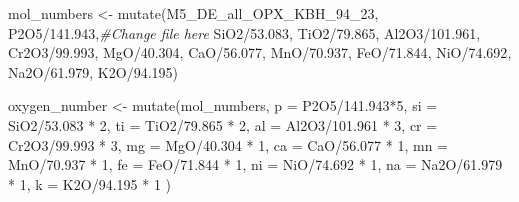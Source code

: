 \documentclass[
]{article}
\newenvironment{Shaded}{\begin{snugshade}}{\end{snugshade}}
\newcommand{\AttributeTok}[1]{\textcolor[rgb]{0.77,0.63,0.00}{#1}}
\newcommand{\CommentTok}[1]{\textcolor[rgb]{0.56,0.35,0.01}{\textit{#1}}}
\newcommand{\DecValTok}[1]{\textcolor[rgb]{0.00,0.00,0.81}{#1}}
\newcommand{\FloatTok}[1]{\textcolor[rgb]{0.00,0.00,0.81}{#1}}
\newcommand{\FunctionTok}[1]{\textcolor[rgb]{0.00,0.00,0.00}{#1}}
\newcommand{\NormalTok}[1]{#1}
\newcommand{\OtherTok}[1]{\textcolor[rgb]{0.56,0.35,0.01}{#1}}
\newcommand{\SpecialCharTok}[1]{\textcolor[rgb]{0.00,0.00,0.00}{#1}}
\begin{document}
\begin{Shaded}
\begin{Highlighting}[]
\NormalTok{mol\_numbers }\OtherTok{\textless{}{-}} \FunctionTok{mutate}\NormalTok{(M5\_DE\_all\_OPX\_KBH\_94\_23, P2O5}\SpecialCharTok{/}\FloatTok{141.943}\NormalTok{,}\CommentTok{\#Change file here}
\NormalTok{                  SiO2}\SpecialCharTok{/}\FloatTok{53.083}\NormalTok{,}
\NormalTok{                  TiO2}\SpecialCharTok{/}\FloatTok{79.865}\NormalTok{,}
\NormalTok{                  Al2O3}\SpecialCharTok{/}\FloatTok{101.961}\NormalTok{,}
\NormalTok{                  Cr2O3}\SpecialCharTok{/}\FloatTok{99.993}\NormalTok{,}
\NormalTok{                  MgO}\SpecialCharTok{/}\FloatTok{40.304}\NormalTok{,}
\NormalTok{                  CaO}\SpecialCharTok{/}\FloatTok{56.077}\NormalTok{,}
\NormalTok{                  MnO}\SpecialCharTok{/}\FloatTok{70.937}\NormalTok{,}
\NormalTok{                  FeO}\SpecialCharTok{/}\FloatTok{71.844}\NormalTok{,}
\NormalTok{                  NiO}\SpecialCharTok{/}\FloatTok{74.692}\NormalTok{,}
\NormalTok{                  Na2O}\SpecialCharTok{/}\FloatTok{61.979}\NormalTok{,}
\NormalTok{                  K2O}\SpecialCharTok{/}\FloatTok{94.195}\NormalTok{)}

\NormalTok{oxygen\_number }\OtherTok{\textless{}{-}} \FunctionTok{mutate}\NormalTok{(mol\_numbers, }\AttributeTok{p =}\NormalTok{ P2O5}\SpecialCharTok{/}\FloatTok{141.943}\SpecialCharTok{*}\DecValTok{5}\NormalTok{,}
                        \AttributeTok{si =}\NormalTok{ SiO2}\SpecialCharTok{/}\FloatTok{53.083} \SpecialCharTok{*} \DecValTok{2}\NormalTok{,}
                        \AttributeTok{ti =}\NormalTok{ TiO2}\SpecialCharTok{/}\FloatTok{79.865} \SpecialCharTok{*} \DecValTok{2}\NormalTok{,}
                        \AttributeTok{al =}\NormalTok{ Al2O3}\SpecialCharTok{/}\FloatTok{101.961} \SpecialCharTok{*} \DecValTok{3}\NormalTok{,}
                        \AttributeTok{cr =}\NormalTok{ Cr2O3}\SpecialCharTok{/}\FloatTok{99.993} \SpecialCharTok{*} \DecValTok{3}\NormalTok{,}
                        \AttributeTok{mg =}\NormalTok{ MgO}\SpecialCharTok{/}\FloatTok{40.304} \SpecialCharTok{*} \DecValTok{1}\NormalTok{,}
                        \AttributeTok{ca =}\NormalTok{ CaO}\SpecialCharTok{/}\FloatTok{56.077} \SpecialCharTok{*} \DecValTok{1}\NormalTok{,}
                        \AttributeTok{mn =}\NormalTok{ MnO}\SpecialCharTok{/}\FloatTok{70.937} \SpecialCharTok{*} \DecValTok{1}\NormalTok{,}
                        \AttributeTok{fe =}\NormalTok{ FeO}\SpecialCharTok{/}\FloatTok{71.844} \SpecialCharTok{*} \DecValTok{1}\NormalTok{,}
                        \AttributeTok{ni =}\NormalTok{ NiO}\SpecialCharTok{/}\FloatTok{74.692} \SpecialCharTok{*} \DecValTok{1}\NormalTok{,}
                        \AttributeTok{na =}\NormalTok{ Na2O}\SpecialCharTok{/}\FloatTok{61.979} \SpecialCharTok{*} \DecValTok{1}\NormalTok{,}
                        \AttributeTok{k =}\NormalTok{ K2O}\SpecialCharTok{/}\FloatTok{94.195} \SpecialCharTok{*} \DecValTok{1}
\NormalTok{                        )}


\end{Highlighting}
\end{Shaded}
\end{document}
